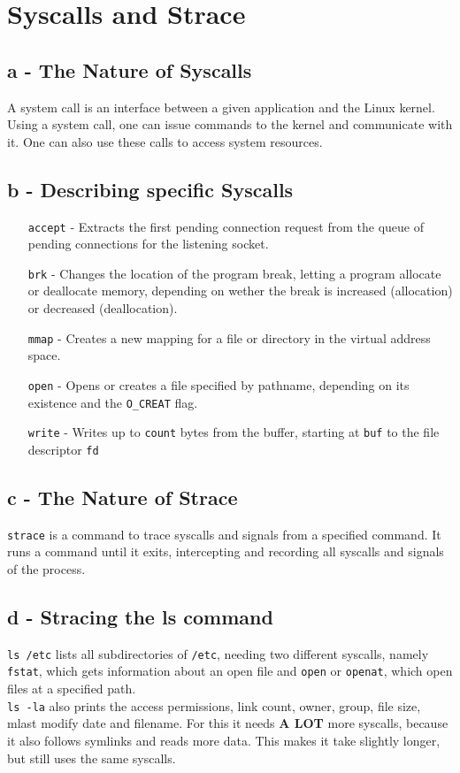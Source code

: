 \documentclass[a4paper, 11pt]{article}
\begin{document}
    \section{Syscalls and Strace}
    
    \subsection{a - The Nature of Syscalls}
    A system call is an interface between a given application and the Linux kernel. Using a system call, one can issue commands to the kernel and communicate with it. 
    One can also use these calls to access system resources.
    
    \subsection{b - Describing specific Syscalls}
    \begin{itemize}
      \item[\texttt{accept} -] Extracts the first pending connection request from the queue of pending connections for the listening socket. 
      \item[\texttt{brk} -] Changes the location of the program break, letting a program allocate or deallocate memory, depending on wether the break is increased (allocation) or decreased (deallocation).
      \item[\texttt{mmap} -] Creates a new mapping for a file or directory in the virtual address space.
      \item[\texttt{open} -] Opens or creates a file specified by pathname, depending on its existence and the \texttt{O\_CREAT} flag.
      \item[\texttt{write} -] Writes up to \texttt{count} bytes from the buffer, starting at \texttt{buf} to the file descriptor \texttt{fd}
    \end{itemize}
    
    \subsection{c - The Nature of Strace}
    \texttt{strace} is a command to trace syscalls and signals from a specified command. It runs a command until it exits, intercepting and recording all syscalls and signals of the process.
    
    \subsection{d - Stracing the ls command}
    \texttt{ls /etc} lists all subdirectories of \texttt{/etc}, needing two different syscalls, namely 
    \texttt{fstat}, which gets information about an open file and \texttt{open} or \texttt{openat}, which open files at a specified path.\\
    \texttt{ls -la} also prints the access permissions, link count, owner, group, file size, mlast modify date and filename. For this it needs \textbf{A LOT} more syscalls, because it also follows symlinks and reads more data.
    This makes it take slightly longer, but still uses the same syscalls.
    \newpage
\end{document}
